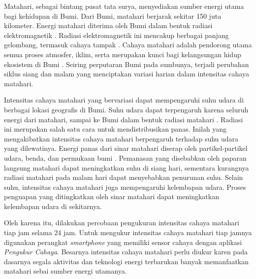 Matahari, sebagai bintang pusat tata surya, menyediakan sumber energi utama bagi kehidupan di Bumi. Dari Bumi, matahari berjarak sekitar 150 juta kilometer. Energi matahari diterima oleh Bumi dalam bentuk radiasi elektromagnetik \cite{blal2020prediction}. Radiasi elektromagnetik ini mencakup berbagai panjang gelombang, termasuk cahaya tampak \cite{rokhaniyah2019alat}. Cahaya matahari adalah pendorong utama semua proses atmosfer, iklim, serta merupakan kunci bagi kelangsungan hidup ekosistem di Bumi \cite{hader2007effects,zarnetske2021potential}. Seiring perputaran Bumi pada sumbunya, terjadi perubahan siklus siang dan malam yang menciptakan variasi harian dalam intensitas cahaya matahari. 

Intensitas cahaya matahari yang bervariasi dapat mempengaruhi suhu udara di berbagai lokasi geografis di Bumi. Suhu udara dapat terpengaruh karena seluruh energi dari matahari, sampai ke Bumi dalam bentuk radiasi matahari \cite{wald:hal-01676634}. Radiasi ini merupakan salah satu cara untuk mendistribusikan panas. Inilah yang mengakibatkan intensitas cahaya matahari berpengaruh terhadap suhu udara yang dilewatinya. Energi panas dari sinar matahari diserap oleh partikel-partikel udara, benda, dan permukaan bumi \cite{Lipinski2021-lp}. Pemanasan yang disebabkan oleh paparan langsung matahari dapat meningkatkan suhu di siang hari, sementara kurangnya radiasi matahari pada malam hari dapat menyebabkan penurunan suhu. Selain suhu, intensitas cahaya matahari juga mempengaruhi kelembapan udara. Proses penguapan yang ditingkatkan oleh sinar matahari dapat meningkatkan kelembapan udara di sekitarnya. 

Oleh karena itu, dilakukan percobaan pengukuran intensitas cahaya matahari tiap jam selama 24 jam. Untuk mengukur intensitas cahaya matahari tiap jamnya digunakan perangkat \textit{smartphone} yang memiliki sensor cahaya dengan aplikasi \textit{Pengukur Cahaya}. Besarnya intensitas cahaya matahari perlu diukur karen pada dasarnya segala aktivitas dan teknologi energi terbarukan banyak memanfaatkan matahari sebai sumber energi utamanya.